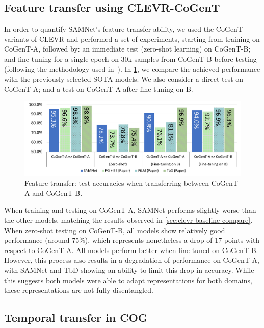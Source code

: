 \subsection{Feature transfer using CLEVR-CoGenT}
\label{sec:feature}

In order to quantify SAMNet's feature transfer ability, we used the CoGenT variants of CLEVR and performed a set of experiments, starting from training on CoGenT-A, followed by:
an immediate test (zero-shot learning) on CoGenT-B; and fine-tuning for a single epoch on 30k samples from CoGenT-B before testing (following the methodology used in~\cite{johnson2017inferring, mascharka2018transparency, perez2018film, marois2018transfer}).
In \cref{fig:CoGenT-B-results}, we compare the achieved performance with the previously selected SOTA models.
We also consider a direct test on CoGenT-A; and a test on CoGenT-A after fine-tuning on B.

\begin{figure}[htbp]
	\centering
	\includegraphics[width=\columnwidth]{../img/plots/cogent_feature_transfer_baselines.pdf}
	\caption{Feature transfer: test accuracies when transferring between CoGenT-A and CoGenT-B.}
	\label{fig:CoGenT-B-results}
\end{figure}

When training and testing on CoGenT-A, SAMNet performs slightly worse than the other models, matching the results observed in \cref{sec:clevr-baseline-compare}.
When zero-shot testing on CoGenT-B, all models show relatively good performance (around 75\%), which represents nonetheless a drop of 17 points with respect to CoGenT-A.
All models perform better when fine-tuned on CoGenT-B.
However, this process also results in a degradation of performance on CoGenT-A, with SAMNet and TbD showing an ability to limit this drop in accuracy.
While this suggests both models were able to adapt representations for both domains, these representations are not fully disentangled.

\subsection{Temporal transfer in COG}
\label{sec:temporal}

